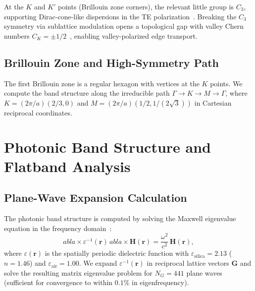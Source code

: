 \documentclass[10pt,letterpaper]{article}
\begin{document}
At the $K$ and $K'$ points (Brillouin zone corners), the relevant little group is $C_3$, supporting Dirac-cone-like dispersions in the TE polarization~\cite{Wu2017}. Breaking the $C_3$ symmetry via sublattice modulation opens a topological gap with valley Chern numbers $C_K = \pm 1/2$~\cite{Ozawa2019,Hafezi2013}, enabling valley-polarized edge transport.

\subsection{Brillouin Zone and High-Symmetry Path}

The first Brillouin zone is a regular hexagon with vertices at the $K$ points. We compute the band structure along the irreducible path $\Gamma \to K \to M \to \Gamma$, where $K = (2\pi/a)(2/3, 0)$ and $M = (2\pi/a)(1/2, 1/(2\sqrt{3}))$ in Cartesian reciprocal coordinates.


\section{Photonic Band Structure and Flatband Analysis}
\label{sec:bandstructure}

\subsection{Plane-Wave Expansion Calculation}

The photonic band structure is computed by solving the Maxwell eigenvalue equation in the frequency domain~\cite{Joannopoulos2008}:
\begin{equation}

	abla \times \varepsilon^{-1}(\mathbf{r})\,
	abla \times \mathbf{H}(\mathbf{r}) = \frac{\omega^2}{c^2}\,\mathbf{H}(\mathbf{r}),
	\label{eq:maxwell}
\end{equation}
where $\varepsilon(\mathbf{r})$ is the spatially periodic dielectric function with $\varepsilon_\mathrm{silica} = 2.13$ ($n = 1.46$) and $\varepsilon_\mathrm{air} = 1.00$. We expand $\varepsilon^{-1}(\mathbf{r})$ in reciprocal lattice vectors $\mathbf{G}$ and solve the resulting matrix eigenvalue problem for $N_G = 441$ plane waves (sufficient for convergence to within $0.1\%$ in eigenfrequency).
\end{document}

